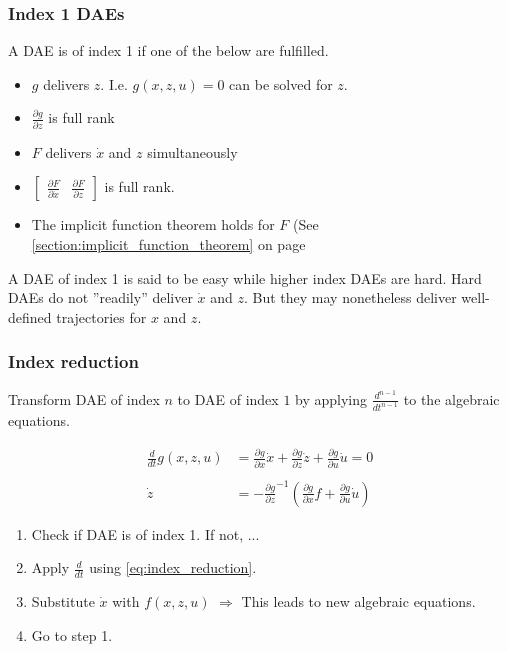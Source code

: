 \subsubsection{Index 1 DAEs}
A DAE is of index 1 if one of the below are fulfilled.
\begin{itemize}
    \item $g$ delivers $z$. I.e. $g(x,z,u)=0$ can be solved for $z$.
    \item $\frac{\partial g}{\partial z}$ is full rank
    \item $F$ delivers $\dot x$ and $z$ simultaneously
    \item 
    $
    \begin{bmatrix}
        \frac{\partial F}{\partial \dot{x}} & \frac{\partial F}{\partial z}
    \end{bmatrix}
    $ 
    is full rank. 
        
    \item The implicit function theorem holds for $F$ (See \autoref{section:implicit_function_theorem} on page \pageref{section:implicit_function_theorem}
\end{itemize}
A DAE of index 1 is said to be easy while higher index DAEs are hard.
Hard DAEs do not ”readily” deliver $\dot x$ and $z$. But they may nonetheless deliver well-defined trajectories for $x$ and $z$.

\subsubsection{Index reduction}
Transform DAE of index $n$ to DAE of index $1$ by applying $\frac{d^{n-1}}{dt^{n-1}}$ to the algebraic equations.

\begin{equation}\label{eq:index_reduction}
    \begin{aligned}
        \frac{d}{dt}g(x,z,u)
        &=\frac{\partial g}{\partial{x}}\dot x
        +\frac{\partial g}{\partial{z}}\dot z 
        +\frac{\partial g}{\partial{u}}\dot u =0\\\\
        \dot z &=-\frac{\partial g}{\partial{z}}^{-1}\left( \frac{\partial g}{\partial{x}}f+ \frac{\partial g}{\partial{u}}\dot u \right)
    \end{aligned}
\end{equation}
\begin{enumerate}
    \item Check if DAE is of index 1. If not, ...
    \item Apply $\frac{d}{dt}$ using \autoref{eq:index_reduction}.
    \item Substitute $\dot x$ with $f(x,z,u)$ $\Rightarrow$ This leads to new algebraic equations.
    \item Go to step 1.
\end{enumerate}

